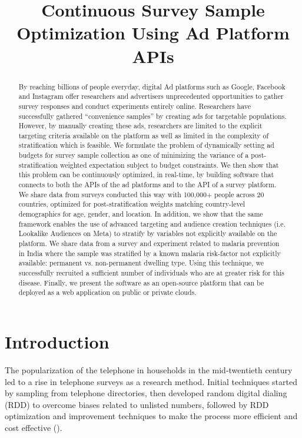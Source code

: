 \documentclass[a4paper,12pt]{article}
\title{Continuous Survey Sample Optimization Using Ad Platform APIs}
\theoremstyle{proposition}
\begin{document}
\maketitle

\begin{abstract}
By reaching billions of people everyday, digital Ad platforms such as Google, Facebook and Instagram offer researchers and advertisers unprecedented opportunities to gather survey responses and conduct experiments entirely online. Researchers have successfully gathered “convenience samples” by creating ads for targetable populations. However, by manually creating these ads, researchers are limited to the explicit targeting criteria available on the platform as well as limited in the complexity of stratification which is feasible. We formulate the problem of dynamically setting ad budgets for survey sample collection as one of minimizing the variance of a post-stratification weighted expectation subject to budget constraints. We then show that this problem can be continuously optimized, in real-time, by building software that connects to both the APIs of the ad platforms and to the API of a survey platform. We share data from surveys conducted this way with 100,000+ people across 20 countries, optimized for post-stratification weights matching country-level demographics for age, gender, and location. In addition, we show that the same framework enables the use of advanced targeting and audience creation techniques (i.e. Lookalike Audiences on Meta) to stratify by variables not explicitly available on the platform. We share data from a survey and experiment related to malaria prevention in India where the sample was stratified by a known malaria risk-factor not explicitly available: permanent vs. non-permanent dwelling type. Using this technique, we successfully recruited a sufficient number of individuals who are at greater risk for this disease. Finally, we present the software as an open-source platform that can be deployed as a web application on public or private clouds.
\end{abstract}

\clearpage

\section{Introduction}

The popularization of the telephone in households in the mid-twentieth century led to a rise in telephone surveys as a research method. Initial techniques started by sampling from telephone directories, then developed random digital dialing (RDD) to overcome biases related to unlisted numbers, followed by RDD optimization and improvement techniques to make the process more efficient and cost effective (\cite{Cooper1964,Glasser1972,Sudman1973}).
\end{document}
